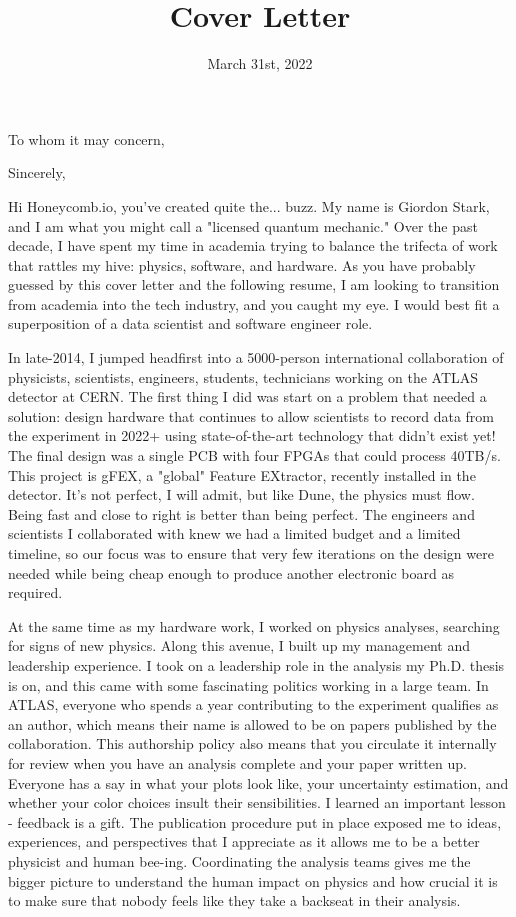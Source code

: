 \documentclass[10pt,letterpaper,sans]{moderncv/moderncv} %
\title{Cover Letter}
\begin{document}
\date{March 31st, 2022}
\opening{To whom it may concern,}
\closing{Sincerely,}

\makelettertitle
\vspace*{-1em}

Hi Honeycomb.io, you've created quite the... buzz. My name is Giordon Stark, and I am what you might call a "licensed quantum mechanic." Over the past decade, I have spent my time in academia trying to balance the trifecta of work that rattles my hive: physics, software, and hardware. As you have probably guessed by this cover letter and the following resume, I am looking to transition from academia into the tech industry, and you caught my eye. I would best fit a superposition of a data scientist and software engineer role.

In late-2014, I jumped headfirst into a 5000-person international collaboration of physicists, scientists, engineers, students, technicians working on the ATLAS detector at CERN. The first thing I did was start on a problem that needed a solution: design hardware that continues to allow scientists to record data from the experiment in 2022+ using state-of-the-art technology that didn't exist yet! The final design was a single PCB with four FPGAs that could process 40TB/s. This project is gFEX, a "global" Feature EXtractor, recently installed in the detector. It's not perfect, I will admit, but like Dune, the physics must flow. Being fast and close to right is better than being perfect. The engineers and scientists I collaborated with knew we had a limited budget and a limited timeline, so our focus was to ensure that very few iterations on the design were needed while being cheap enough to produce another electronic board as required.

At the same time as my hardware work, I worked on physics analyses, searching for signs of new physics. Along this avenue, I built up my management and leadership experience. I took on a leadership role in the analysis my Ph.D. thesis is on, and this came with some fascinating politics working in a large team. In ATLAS, everyone who spends a year contributing to the experiment qualifies as an author, which means their name is allowed to be on papers published by the collaboration. This authorship policy also means that you circulate it internally for review when you have an analysis complete and your paper written up. Everyone has a say in what your plots look like, your uncertainty estimation, and whether your color choices insult their sensibilities. I learned an important lesson - feedback is a gift. The publication procedure put in place exposed me to ideas, experiences, and perspectives that I appreciate as it allows me to be a better physicist and human bee-ing. Coordinating the analysis teams gives me the bigger picture to understand the human impact on physics and how crucial it is to make sure that nobody feels like they take a backseat in their analysis.
\end{document}
